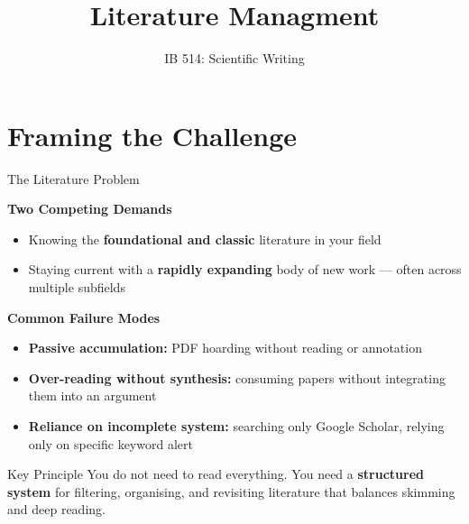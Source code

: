 \documentclass{beamer}
\title{Literature Managment}
\author[]{IB 514: Scientific Writing}
\date[]{}
\begin{document}

\begin{frame}
  \titlepage
\end{frame}

\begin{frame}
  \tableofcontents
\end{frame}
\section{Framing the Challenge}
\begin{frame}{The Literature Problem}

  \footnotesize
  \textbf{Two Competing Demands}
  \begin{itemize}
    \item Knowing the \textbf{foundational and classic} literature
      in your field
    \item Staying current with a \textbf{rapidly expanding} body
      of new work --- often across multiple subfields
  \end{itemize}

  \medskip
  \textbf{Common Failure Modes}
  \begin{itemize}
    \item \textbf{Passive accumulation:} PDF hoarding without
      reading or annotation
    \item \textbf{Over-reading without synthesis:} consuming
      papers without integrating them into an argument
    \item \textbf{Reliance on incomplete system:} searching
      only Google Scholar, relying only on specific keyword alert
  \end{itemize}

  \medskip
  \begin{block}{Key Principle}
    You do not need to read everything.
    You need a \textbf{structured system} for filtering,
    organising, and revisiting literature that balances skimming
    and deep reading.
  \end{block}

\end{frame}
\end{document}
